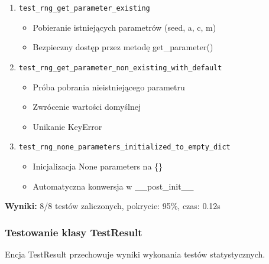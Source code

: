 \documentclass[12pt,a4paper]{article}
\begin{document}
\begin{enumerate}
    \item \texttt{test\_rng\_get\_parameter\_existing}
    \begin{itemize}
        \item Pobieranie istniejących parametrów (seed, a, c, m)
        \item Bezpieczny dostęp przez metodę get\_parameter()
    \end{itemize}
    
    \item \texttt{test\_rng\_get\_parameter\_non\_existing\_with\_default}
    \begin{itemize}
        \item Próba pobrania nieistniejącego parametru
        \item Zwrócenie wartości domyślnej
        \item Unikanie KeyError
    \end{itemize}
    
    \item \texttt{test\_rng\_none\_parameters\_initialized\_to\_empty\_dict}
    \begin{itemize}
        \item Inicjalizacja None parameters na \{\}
        \item Automatyczna konwersja w \_\_post\_init\_\_
    \end{itemize}
\end{enumerate}

\textbf{Wyniki:} 8/8 testów zaliczonych, pokrycie: 95\%, czas: 0.12s

\subsubsection{Testowanie klasy TestResult}

Encja TestResult przechowuje wyniki wykonania testów statystycznych.
\end{document}
